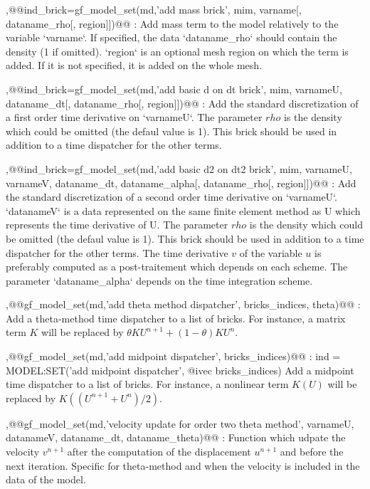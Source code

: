 \begin{cmddescription}
\sep{@@ind_brick=gf_model_set(md,'add mass brick', \tmim mim, \tstr varname[, \tstr dataname_rho[, \tint region]])@@} :
Add mass term to the model relatively to the variable `varname`.
If specified, the data `dataname_rho` should contain the density (1 if omitted).
`region` is an optional mesh region on which the term is added.
If it is not specified, it is added on the whole mesh.

\sep{@@ind_brick=gf_model_set(md,'add basic d on dt brick', \tmim mim, \tstr varnameU,  \tstr dataname_dt[, \tstr dataname_rho[, \tint region]])@@} :
Add the standard discretization of a first order time derivative on
`varnameU`. The parameter $rho$ is the density which could be omitted
(the defaul value is 1). This brick should be used in addition to a
time dispatcher for the other terms.

\sep{@@ind_brick=gf_model_set(md,'add basic d2 on dt2 brick', \tmim mim, \tstr varnameU,  \tstr varnameV, \tstr dataname_dt, \tstr dataname_alpha[, \tstr dataname_rho[, \tint region]])@@} :
Add the standard discretization of a second order time derivative
on `varnameU`. `datanameV` is a data represented on the same finite
element method as U which represents the time derivative of U. The
parameter $rho$ is the density which could be omitted (the defaul value
is 1). This brick should be used in addition to a time dispatcher for the
other terms. The time derivative $v$ of the variable $u$ is preferably
computed as a post-traitement which depends on each scheme. The parameter
`dataname_alpha` depends on the time integration scheme.

\sep{@@gf_model_set(md,'add theta method dispatcher', \tivec bricks_indices, \tstr theta)@@} :
Add a theta-method time dispatcher to a list of bricks. For instance,
a matrix term $K$ will be replaced by
$\theta K U^{n+1} + (1-\theta) K U^{n}$.

\sep{@@gf_model_set(md,'add midpoint dispatcher', \tivec bricks_indices)@@} :
ind = MODEL:SET('add midpoint dispatcher', @ivec bricks_indices)
Add a midpoint time dispatcher to a list of bricks. For instance,
a nonlinear term $K(U)$ will be replaced by
$K((U^{n+1} +  U^{n})/2)$.

\sep{@@gf_model_set(md,'velocity update for order two theta method',  \tstr varnameU,  \tstr datanameV, \tstr dataname_dt, \tstr dataname_theta)@@} :
Function which udpate the velocity $v^{n+1}$ after the computation
of the displacement $u^{n+1}$ and before the next iteration. Specific
for theta-method and when the velocity is included in the data
of the model.


\end{cmddescription}
